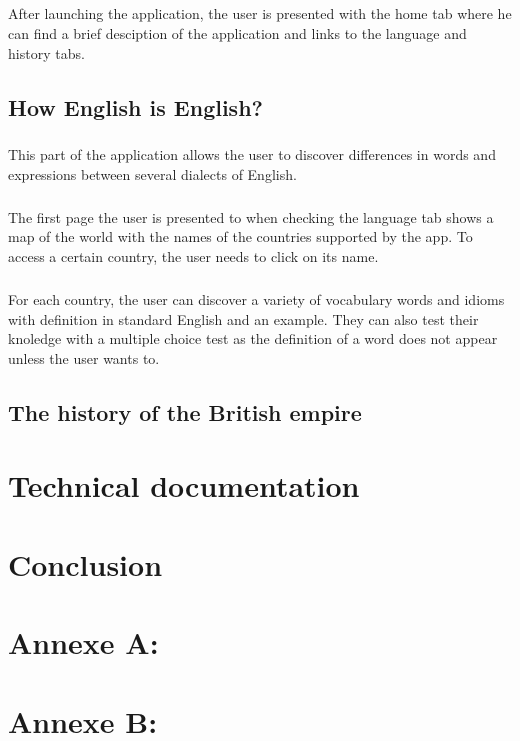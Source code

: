 \documentclass[11pt, a4paper]{report}
\begin{document}
\paragraph{}After launching the application, the user is presented with the home tab where he can find a brief desciption of the application and links to the language and history tabs.


\section*{How English is English?}
\paragraph{}This part of the application allows the user to discover differences in words and expressions between several dialects of English.

\paragraph{}The first page the user is presented to when checking the language tab shows a map of the world with the names of the countries supported by the app. To access a certain country, the user needs to click on its name.

\paragraph{}For each country, the user can discover a variety of vocabulary words and idioms with definition in standard English and an example. They can also test their knoledge with a multiple choice test as the definition of a word does not appear unless the user wants to.

\section*{The history of the British empire}



\chapter*{Technical documentation}


\chapter*{Conclusion}



\newpage

\appendix
\chapter*{Annexe A: }

\newpage

\chapter*{Annexe B: }
\end{document}
